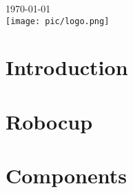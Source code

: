 \documentclass[12pt]{article}
\begin{document}
\begin{titlepage}


{\large \today}\\[2cm] %


\texttt{[image: pic/logo.png]}\\[1cm] %
 

\vfill %

\end{titlepage}

\tableofcontents

\listoffigures

\listoftables


\newpage


\begin{abstract}
	
\end{abstract}

\section{Introduction}
	

\section{Robocup}
	

\section{Components}
\end{document}
